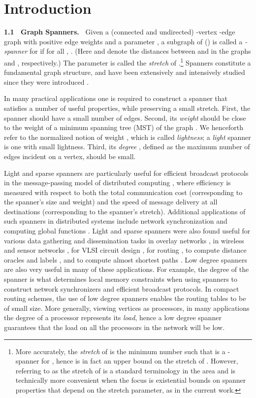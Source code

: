 \documentclass[11pt,letterpaper]{article}
\begin{document}
\section{Introduction}
\vspace{3pt}
{\bf 1.1~ Graph Spanners.~}
Given a (connected and undirected) -vertex -edge graph  with positive edge weights and a parameter , a subgraph  of 
() is called a \emph{-spanner} for  if for all , .
(Here  and  denote the distances between  and  in the graphs  and , respectively.)
The parameter  is called the \emph{stretch} of .\footnote{More accurately, the \emph{stretch} of  is the minimum number  such that  is a -spanner for , hence  is in fact an upper bound on the stretch of . However, referring to  as the stretch of  is a standard terminology in the area and is technically more convenient when the focus is existential bounds on spanner properties that depend on the stretch parameter, as in the current work.}
Spanners constitute a fundamental graph structure, and have been extensively and intensively studied since they were introduced \cite{PS89,PU89}.

In many practical applications one is required to construct a spanner that satisfies a number of useful properties, while preserving a small stretch.
First, the spanner  should have a small number of edges.
Second, its \emph{weight}  should be close to the weight of a minimum spanning tree (MST) of the graph .
We henceforth refer to the normalized notion of weight , which is called \emph{lightness};
a \emph{light} spanner is one with small lightness.
Third, its \emph{degree} , defined as the maximum number of edges incident on a vertex, should be small.

Light and sparse spanners are particularly useful for efficient broadcast protocols in the message-passing model of distributed computing \cite{ABP90,ABP91},
where efficiency is measured with respect to both the total communication cost (corresponding to the spanner's size and weight) and the speed of message delivery at all destinations (corresponding to the spanner's stretch).
Additional applications of such spanners in distributed systems include network synchronization and computing global functions \cite{Awerbuch85,PU89,ABP90,ABP91,Peleg00}. Light and sparse spanners were also found useful for various data gathering and dissemination tasks in overlay networks \cite{BKRCV02,VWFME03,KV01}, in wireless and sensor networks \cite{RW04,BDS04,SS10}, for VLSI circuit design \cite{CKRSW91,CKRSW292,CKRSW92,SCRS01},
for routing \cite{WCT02,PU89,PU89b,TZ01}, to compute distance oracles and labels \cite{Peleg00Prox,TZ01b,RTZ05}, and to compute almost shortest paths \cite{Coh98,RZ11,Elkin05,EZ06,FKMSZ05}. Low degree spanners are also very useful in many of these applications.
For example, the degree of the spanner is what determines local memory constraints when using
spanners to construct network synchronizers  and efficient broadcast protocols.
In compact routing schemes, the use of low degree spanners enables the routing tables to be of small size.
More generally, viewing vertices as processors, in many applications the degree of a processor
represents its \emph{load}, hence a low degree spanner guarantees that the load on all the processors in the network will be low.
\end{document}
